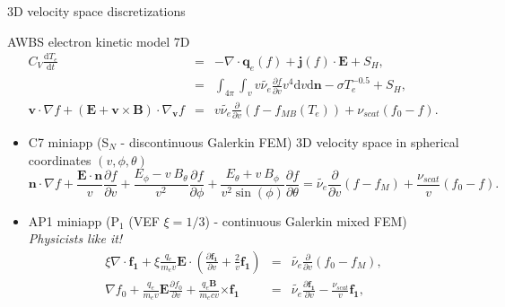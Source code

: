 \documentclass[8pt, compress]{beamer}
\newcommand{\pdv}[2]{\frac{\partial{#1}}{\partial{#2}}}
\newcommand{\vect}[1]{\boldsymbol{#1}}
\newcommand{\dI}{\text{d}}
\newcommand{\nue}{\nu_{e}}
\newcommand{\nuei}{\nu_{ei}}
\newcommand{\nuscat}{\nu_{scat}}
\newcommand{\vmag}{v}
\newcommand{\vn}{\vect{n}}
\newcommand{\E}{\vect{E}}
\newcommand{\B}{\vect{B}}
\newcommand{\qe}{q_e}
\newcommand{\me}{m_e}
\newcommand{\Te}{T_e}
\newcommand{\fM}{f_M}
\newcommand{\fzero}{f_0}
\newcommand{\fone}{{\vect{f_1}}}
\begin{document}
\begin{frame}
\begin{center}
{\Large 3D velocity space discretizations}
\begin{myNblock}{AWBS electron kinetic model 7D}
\begin{eqnarray}
  C_V \frac{\dI T_e}{\dI t} 
  &=& 
  - \nabla\cdot\vect{q}_e(f) 
  + \vect{j}(f)\cdot\E
  + S_H , 
  \nonumber \\
  &=& 
    \int_{4\pi}\int_\vmag v \tilde{\nue} \frac{\partial f}{\partial v} \vmag^4\dI\vmag\dI\vn - \sigma \Te^{-0.5}
  + S_H ,
  \nonumber\\
  \vect{v}\cdot\nabla f +
  \left( \vect{E} + \vect{v}\times\vect{B}\right)\cdot\nabla_{\vect{v}} f
  &=& 
  v \tilde{\nue} \frac{\partial }{\partial v}\left(f - f_{MB}(T_e)\right)
  + \nuscat \left(\fzero - f \right) .
  \nonumber
\end{eqnarray}
\end{myNblock}
\begin{itemize}
    \item C7 miniapp (S$_N$ - discontinuous Galerkin FEM) 3D velocity space in spherical coordinates $(\vmag, \phi, \theta)$
\begin{equation}
  \vn\cdot\nabla f + \frac{\E\cdot\vn}{\vmag} \pdv{f}{\vmag} 
  + \frac{E_\phi 
  - \vmag~B_\theta}{\vmag^2}\pdv{f}{\phi}
  + \frac{E_\theta + \vmag~B_\phi}
  {\vmag^2\sin(\phi)}\pdv{f}{\theta}
  = 
  \tilde{\nue} \frac{\partial }{\partial v}\left(f -\fM\right)
  + \frac{\nuscat}{\vmag} \left(\fzero - f \right) .
  \nonumber
\end{equation}

  \item AP1 miniapp (P$_1$ (VEF $\xi=1/3$) - continuous Galerkin mixed FEM)  
      \it{Physicists like it!}
\begin{eqnarray}
  \xi\nabla\cdot\fone + \xi\frac{\qe}{\me\vmag}\E\cdot\left(
  \pdv{\fone}{\vmag} + \frac{2}{\vmag}\fone\right)
  &=& \tilde{\nue}\pdv{}{\vmag}\left(\fzero - \fM \right) , 
  \nonumber \\
  \nabla\fzero + 
  \frac{\qe}{\me\vmag}\E\pdv{\fzero}{\vmag} 
  +\frac{\qe\B}{\me c \vmag}\vect{\times} \fone
  &=& \tilde{\nue}\pdv{\fone}{\vmag}
  - \frac{\nuscat}{\vmag}\fone 
  ,
  \nonumber \label{eq:AP1f1}
\end{eqnarray}

\end{itemize}
\end{center}
\end{frame}
\end{document}
